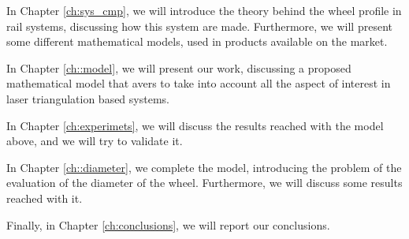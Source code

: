 In Chapter \ref{ch:sys_cmp}, we will introduce the theory behind the wheel profile in rail systems, discussing how this system are made. Furthermore, we will present some different mathematical models, used in products available on the market.

In Chapter \ref{ch::model}, we will present our work, discussing a proposed mathematical model that avers to take into account all the aspect of interest in laser triangulation based systems.

In Chapter \ref{ch:experimets}, we will discuss the results reached with the model above, and we will try to validate it. 

In Chapter \ref{ch::diameter}, we complete the model, introducing the problem of the evaluation of the diameter of the wheel. Furthermore, we will discuss some results reached with it.

Finally, in Chapter \ref{ch:conclusions}, we will report our conclusions.

